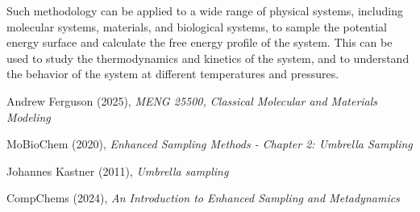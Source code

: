 \documentclass{article}
\begin{document}
Such methodology can be applied to a wide range of physical systems, including molecular systems, materials, and biological systems, to sample the potential energy surface and calculate the free energy profile of the system. This can be used to study the thermodynamics and kinetics of the system, and to understand the behavior of the system at different temperatures and pressures.


\begin{thebibliography}{9}

Andrew Ferguson (2025), \emph{MENG 25500, Classical Molecular and Materials Modeling}

MoBioChem (2020), \emph{Enhanced Sampling Methods - Chapter 2: Umbrella Sampling}

Johannes Kastner (2011), \emph{Umbrella sampling}

CompChems (2024), \emph{An Introduction to Enhanced Sampling and Metadynamics}

\end{thebibliography}
\end{document}
